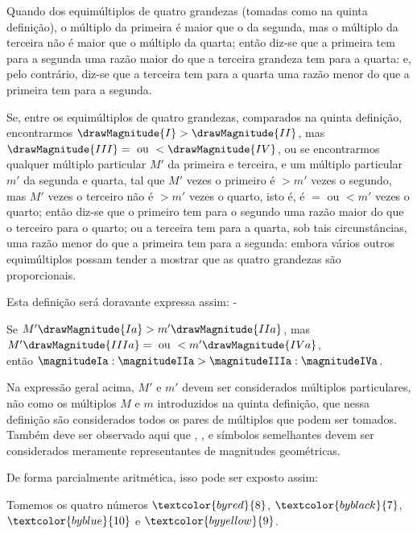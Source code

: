 \documentclass[booklanguage=brazilian]{byrnebook}
\begin{document}
Quando dos equimúltiplos de quatro grandezas (tomadas como na quinta definição), o múltiplo da primeira é maior que o da segunda, mas o múltiplo da terceira não é maior que o múltiplo da quarta; então diz-se que a primeira tem para a segunda uma razão maior do que a terceira grandeza tem para a quarta: e, pelo contrário, diz-se que a terceira tem para a quarta uma razão menor do que a primeira tem para a segunda.

Se, entre os equimúltiplos de quatro grandezas, comparados na quinta definição, encontrarmos $\drawMagnitude{I} > \drawMagnitude{II}$, mas $\drawMagnitude{III} = \mbox{ ou } < \drawMagnitude{IV}$, ou se encontrarmos qualquer múltiplo particular $M'$ da primeira e terceira, e um múltiplo particular $m'$ da segunda e quarta, tal que $M'$ vezes o primeiro é $> m'$ vezes o segundo, mas $M'$ vezes o terceiro não é $> m'$ vezes o quarto, isto é, é $= \mbox{ ou } < m'$ vezes o quarto; então diz-se que o primeiro tem para o segundo uma razão maior do que o terceiro para o quarto; ou a terceira tem para a quarta, sob tais circunstâncias, uma razão menor do que a primeira tem para a segunda: embora vários outros equimúltiplos possam tender a mostrar que as quatro grandezas são proporcionais.

Esta definição será doravante expressa assim: -

\begin{center}
Se $M' \drawMagnitude{Ia} > m' \drawMagnitude{IIa}$, mas $M' \drawMagnitude{IIIa} = \mbox{ ou } < m' \drawMagnitude{IVa}$,\\
então $\magnitudeIa : \magnitudeIIa > \magnitudeIIIa : \magnitudeIVa$.
\end{center}

Na expressão geral acima, $M'$ e $m'$ devem ser considerados múltiplos particulares, não como os múltiplos $M$ e $m$ introduzidos na quinta definição, que nessa definição são considerados todos os pares de múltiplos que podem ser tomados. Também deve ser observado aqui que \magnitudeIa, \magnitudeIIa, \magnitudeIIIa e símbolos semelhantes devem ser considerados meramente representantes de magnitudes geométricas.

De forma parcialmente aritmética, isso pode ser exposto assim:

Tomemos os quatro números $\textcolor{byred}{8}$, $\textcolor{byblack}{7}$, $\textcolor{byblue}{10}$ e $\textcolor{byyellow}{9}$.
\end{document}
